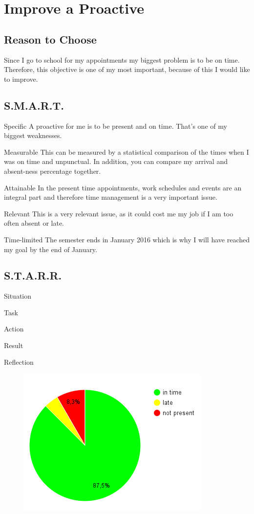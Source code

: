 \section{Improve a Proactive}
	\subsection{Reason to Choose}
		Since I go to school for my appointments my biggest problem is to be on time. Therefore, this objective is one of my most important, because of this I would like to improve.
	
	\subsection{S.M.A.R.T.}
		\begin{SMART}
		    \item[Specific] A proactive for me is to be present and on time. That's one of my biggest weaknesses.
		    \item[Measurable] This can be measured by a statistical comparison of the times when I was on time and unpunctual. In addition, you can compare my arrival and absent-ness percentage together.
		    \item[Attainable] In the present time appointments, work schedules and events are an integral part and therefore time management is a very important issue.
		    \item[Relevant] This is a very relevant issue, as it could cost me my job if I am too often absent or late.
		    \item[Time-limited] The semester ends in January 2016 which is why I will have reached my goal by the end of January.
		\end{SMART}
	
	\subsection{S.T.A.R.R.}
		\begin{STARR}
		    \item[Situation] 
		    \item[Task] 
		    \item[Action] 
		    \item[Result] 
		    \item[Reflection] 
		\end{STARR}
		
		\begin{figure}[htbp]
			\includegraphics[width=\textwidth]{../img/inTimeDiagramm}
		\end{figure}